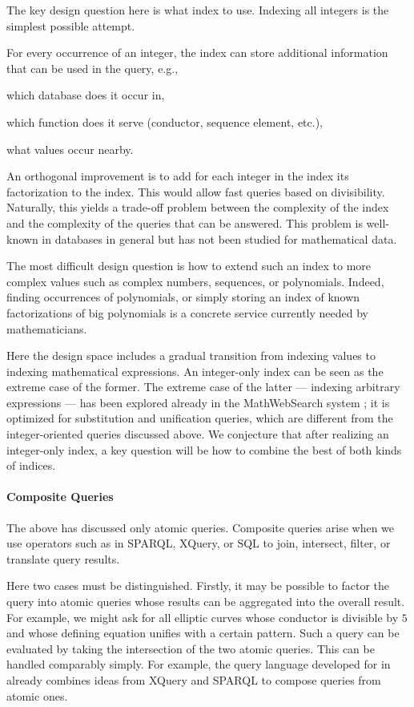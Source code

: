 The key design question here is what index to use.
Indexing all integers is the simplest possible attempt.

For every occurrence of an integer, the index can store additional information that can be used in the query, e.g.,
\begin{compactitem}
 \item which database does it occur in,
 \item which function does it serve (conductor, sequence element, etc.),
 \item what values occur nearby.
\end{compactitem}

An orthogonal improvement is to add for each integer in the index its factorization to the index.
This would allow fast queries based on divisibility.
Naturally, this yields a trade-off problem between the complexity of the index and the complexity of the queries that can be answered.
This problem is well-known in databases in general but has not been studied for mathematical data.

The most difficult design question is how to extend such an index to more complex values such as complex numbers, sequences, or polynomials.
Indeed, finding occurrences of polynomials, or simply storing an index of known factorizations of big polynomials is a concrete service currently needed by mathematicians.

Here the design space includes a gradual transition from indexing values to indexing mathematical expressions.
An integer-only index can be seen as the extreme case of the former.
The extreme case of the latter --- indexing arbitrary expressions --- has been explored already in the MathWebSearch system \cite{ODK-D6.1}; it is optimized for substitution and unification queries, which are different from the integer-oriented queries discussed above.
We conjecture that after realizing an integer-only index, a key question will be how to combine the best of both kinds of indices.

\paragraph{Composite Queries}
The above has discussed only atomic queries.
Composite queries arise when we use operators such as in SPARQL, XQuery, or SQL to join, intersect, filter, or translate query results.

Here two cases must be distinguished.
Firstly, it may be possible to factor the query into atomic queries whose results can be aggregated into the overall result.
For example, we might ask for all elliptic curves whose conductor is divisible by $5$ and whose defining equation unifies with a certain pattern.
Such a query can be evaluated by taking the intersection of the two atomic queries.
This can be handled comparably simply.
For example, the query language developed for \MMT in \cite{Rabe:qlfml12} already combines ideas from XQuery and SPARQL to compose queries from atomic ones.


